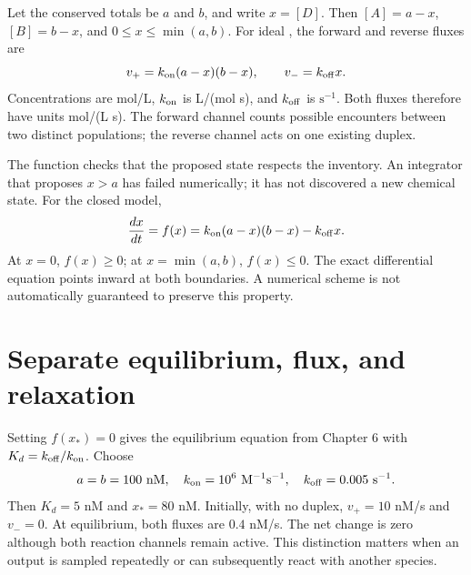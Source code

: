 
Let the conserved totals be $a$ and $b$, and write $x=[D]$. Then
$[A]=a-x$, $[B]=b-x$, and $0\leq x\leq\min(a,b)$. For ideal
, the forward and reverse fluxes are
\begin{equation}
 v_+=k_{\rm on}(a-x)(b-x),\qquad v_-=k_{\rm off}x.
 \label{eq:flux}
\end{equation}
Concentrations are mol/L, $k_{\rm on}$ is L/(mol s), and $k_{\rm off}$ is
$\mathrm{s}^{-1}$. Both fluxes therefore have units mol/(L s).
The forward channel counts possible encounters between two distinct
populations; the reverse channel acts on one existing duplex.


The function checks that the proposed state respects the inventory.
An integrator that proposes $x>a$ has failed numerically; it has not
discovered a new chemical state. For the closed model,
\begin{equation}
 \frac{dx}{dt}=f(x)=k_{\rm on}(a-x)(b-x)-k_{\rm off}x.
 \label{eq:ode}
\end{equation}
At $x=0$, $f(x)\geq0$; at $x=\min(a,b)$, $f(x)\leq0$.
The exact differential equation points inward at both boundaries.
A numerical scheme is not automatically guaranteed to preserve this property.

\section{Separate equilibrium, flux, and relaxation}

Setting $f(x_*)=0$ gives the equilibrium equation from Chapter 6 with
$K_d=k_{\rm off}/k_{\rm on}$. Choose
\begin{equation}
 a=b=100\ {\rm nM},\quad k_{\rm on}=10^6\ {\rm M}^{-1}{\rm s}^{-1},
 \quad k_{\rm off}=0.005\ {\rm s}^{-1}.
\end{equation}
Then $K_d=5$ nM and $x_*=80$ nM. Initially, with no duplex,
$v_+=10$ nM/s and $v_-=0$. At equilibrium, both fluxes are
$0.4$ nM/s. The net change is zero although both reaction channels remain active.
This distinction matters when an output is sampled repeatedly or can
subsequently react with another species.

